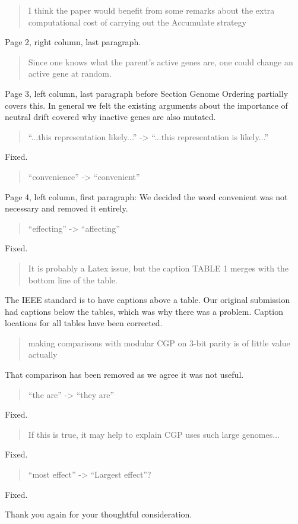 \documentclass{letter}
\begin{document}
\begin{letter}{}
\begin{quote}I think the paper would benefit from some
remarks about the extra computational cost of carrying out the Accumulate strategy\end{quote}
Page 2, right column, last paragraph.

\begin{quote}Since one knows what the parent's active genes are, one could change an active gene at random.\end{quote}
Page 3, left column, last paragraph before Section Genome Ordering partially covers this.  In general
we felt the existing arguments about the importance of neutral drift covered why inactive genes are
also mutated.

\begin{quote}``...this representation likely...'' -> ``...this representation is likely...''\end{quote}
Fixed.

\begin{quote}``convenience'' -> ``convenient''\end{quote}
Page 4, left column, first paragraph: We decided the word convenient was not necessary and removed
it entirely.

\begin{quote}``effecting'' -> ``affecting''\end{quote}
Fixed.

\begin{quote}It is probably a Latex issue, but the caption TABLE 1 merges with the bottom line of the table.\end{quote}
The IEEE standard is to have captions above a table.  Our original submission had captions below
the tables, which was why there was a problem.  Caption locations for all tables have been corrected.

\begin{quote}making comparisons with modular CGP on 3-bit parity is of little value actually\end{quote}
That comparison has been removed as we agree it was not useful.

\begin{quote}``the are'' -> ``they are''\end{quote}
Fixed.

\begin{quote}If this is true, it may help to explain CGP uses such large genomes...\end{quote}
Fixed.

\begin{quote}``most effect'' -> ``Largest effect''?\end{quote}
Fixed.

\closing{Thank you again for your thoughtful consideration.}
\end{letter}
\end{document}
